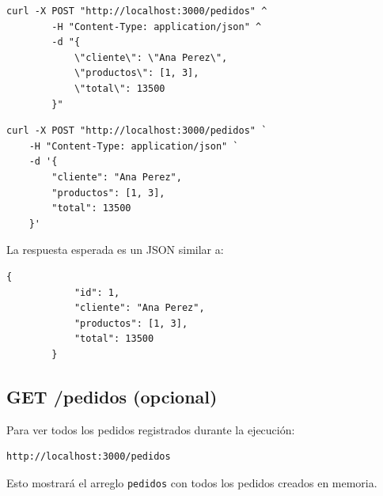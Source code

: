 \documentclass[11pt,a4paper]{article}
\begin{document}
	
	\begin{lstlisting}[style=terminalstyle, caption={Usando cmd de Windows}]
		curl -X POST "http://localhost:3000/pedidos" ^
		-H "Content-Type: application/json" ^
		-d "{
			\"cliente\": \"Ana Perez\",
			\"productos\": [1, 3],
			\"total\": 13500
		}"
	\end{lstlisting}

	\begin{lstlisting}[style=terminalstyle, caption={Usando PowerShell de Windows}]
	curl -X POST "http://localhost:3000/pedidos" `
	-H "Content-Type: application/json" `
	-d '{
		"cliente": "Ana Perez",
		"productos": [1, 3],
		"total": 13500
	}'
\end{lstlisting}	
	
	
	La respuesta esperada es un JSON similar a:
	
	\begin{lstlisting}[style=terminalstyle]
		{
			"id": 1,
			"cliente": "Ana Perez",
			"productos": [1, 3],
			"total": 13500
		}
	\end{lstlisting}
	
	\subsection{GET /pedidos (opcional)}
	
	Para ver todos los pedidos registrados durante la ejecuci\'on:
	
	\begin{lstlisting}[style=terminalstyle]
		http://localhost:3000/pedidos
	\end{lstlisting}
	
	Esto mostrar\'a el arreglo \texttt{pedidos} con todos los pedidos creados en memoria.
	
\end{document}
